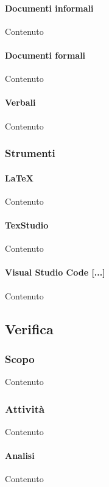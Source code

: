     \paragraph{Documenti informali}
    Contenuto

    \paragraph{Documenti formali}
    Contenuto

    \paragraph{Verbali}
    Contenuto


    \subsubsection{Strumenti}

    \paragraph{\LaTeX}
    Contenuto

    \paragraph{TexStudio}
    Contenuto

    \paragraph{Visual Studio Code [...]}
    Contenuto


    \subsection{Verifica}

    \subsubsection{Scopo}
    Contenuto

    \subsubsection{Attivit\`a}
    Contenuto


    \paragraph{Analisi}
    Contenuto

